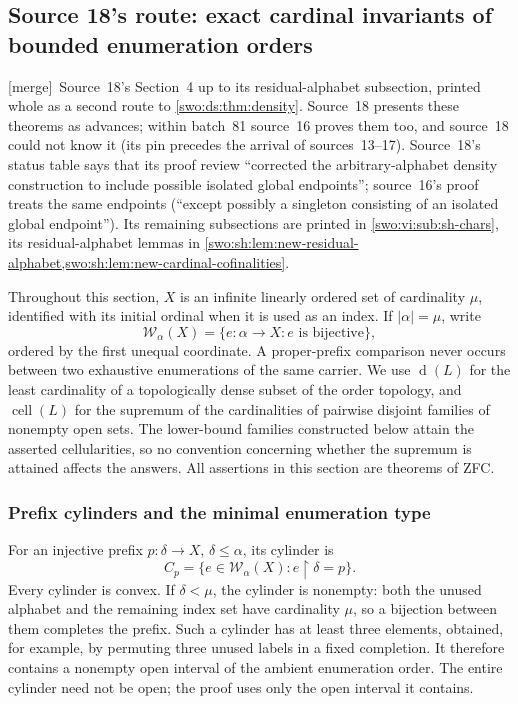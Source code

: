 \documentclass[11pt]{article}
\theoremstyle{definition}
\theoremstyle{remark}
\newcommand{\WO}{\mathcal W}
\newcommand{\merge}{\textsf{[merge]}}
\newcommand{\dens}{\operatorname{d}}
\newcommand{\cell}{\operatorname{cell}}
\begin{document}
\subsection{Source 18's route: exact cardinal invariants of bounded enumeration orders}
\label{swo:sh:sec:new-bounded-invariants}

\merge\ Source~18's Section~4 up to its residual-alphabet subsection,
printed whole as a second route to \cref{swo:ds:thm:density}. Source~18
presents these theorems as advances; within batch~81 source~16 proves them too,
and source~18 could not know it (its pin precedes the arrival of
sources~13--17). Source~18's status table says that its proof review
``corrected the arbitrary-alphabet density construction to include possible
isolated global endpoints''; source~16's proof treats the same endpoints
(``except possibly a singleton consisting of an isolated global endpoint'').
Its remaining subsections are printed in \cref{swo:vi:sub:sh-chars}, its
residual-alphabet lemmas in \cref{swo:sh:lem:new-residual-alphabet,swo:sh:lem:new-cardinal-cofinalities}.


Throughout this section, $X$ is an infinite linearly ordered set of
cardinality $\mu$, identified with its initial ordinal when it is used as
an index.  If $|\alpha|=\mu$, write
\[
 \WO_\alpha(X)=\{e:\alpha\longrightarrow X:e\text{ is bijective}\},
\]
ordered by the first unequal coordinate.  A proper-prefix comparison
never occurs between two exhaustive enumerations of the same carrier.
We use $\dens(L)$ for the least cardinality of a topologically dense subset
of the order topology, and $\cell(L)$ for the supremum of the cardinalities
of pairwise disjoint families of nonempty open sets.  The lower-bound
families constructed below attain the asserted cellularities, so no
convention concerning whether the supremum is attained affects the
answers.  All assertions in this section are theorems of ZFC.

\subsubsection{Prefix cylinders and the minimal enumeration type}

For an injective prefix $p:\delta\to X$, $\delta\leq\alpha$, its cylinder
is
\[
 C_p=\{e\in\WO_\alpha(X):e\restriction\delta=p\}.
\]
Every cylinder is convex.  If $\delta<\mu$, the cylinder is nonempty:
both the unused alphabet and the remaining index set have cardinality
$\mu$, so a bijection between them completes the prefix.  Such a
cylinder has at least three elements, obtained, for example, by
permuting three unused labels in a fixed completion.  It therefore
contains a nonempty open interval of the ambient enumeration order.
The entire cylinder need not be open; the proof uses only the open
interval it contains.
\end{document}
